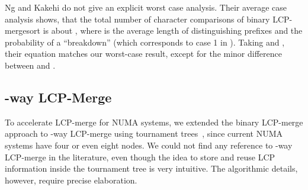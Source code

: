 \documentclass[a4paper]{myjournal}
\begin{document}
Ng and Kakehi \cite{ng2008merging} do not give an explicit worst case
analysis. Their average case analysis shows, that the total number of character
comparisons of binary LCP-mergesort is about , where  is the average length of distinguishing prefixes and
 the probability of a ``breakdown'' (which corresponds to case 1 in
\LCPCompare). Taking  and , their equation
matches our worst-case result, except for the minor difference between  and
.

\subsection{\texorpdfstring{}{K}-way LCP-Merge}\label{sec:merge-kway}

To accelerate LCP-merge for NUMA systems, we extended the binary LCP-merge
approach to -way LCP-merge using tournament
trees~\cite{knuth1998sorting,sanders00fast}, since current NUMA systems have
four or even eight nodes. We could not find any reference to -way LCP-merge
in the literature, even though the idea to store and reuse LCP information
inside the tournament tree is very intuitive. The algorithmic details, however,
require precise elaboration.
\end{document}
